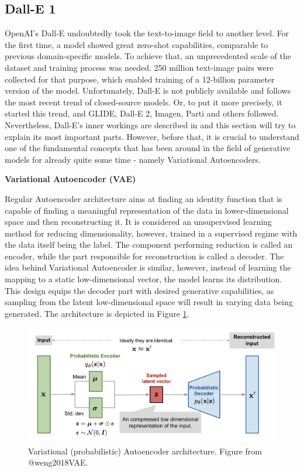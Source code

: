 \documentclass[
]{krantz}
\begin{document}
\hypertarget{dall-e-1}{%
\subsection{Dall-E 1}\label{dall-e-1}}

OpenAI's Dall-E undoubtedly took the text-to-image field to another level. For the first time, a model showed great zero-shot capabilities, comparable to previous domain-specific models. To achieve that, an unprecedented scale of the dataset and training process was needed. 250 million text-image pairs were collected for that purpose, which enabled training of a 12-billion parameter version of the model. Unfortunately, Dall-E is not publicly available and follows the most recent trend of closed-source models. Or, to put it more precisely, it started this trend, and GLIDE, Dall-E 2, Imagen, Parti and others followed. Nevertheless, Dall-E's inner workings are described in \citet{DALLE1} and this section will try to explain its most important parts. However, before that, it is crucial to understand one of the fundamental concepts that has been around in the field of generative models for already quite some time - namely Variational Autoencoders.

\textbf{Variational Autoencoder (VAE)}

Regular Autoencoder architecture aims at finding an identity function that is capable of finding a meaningful representation of the data in lower-dimensional space and then reconstructing it. It is considered an unsupervised learning method for reducing dimensionality, however, trained in a supervised regime with the data itself being the label. The component performing reduction is called an encoder, while the part responsible for reconstruction is called a decoder. The idea behind Variational Autoencoder \citep{VAE2013} is similar, however, instead of learning the mapping to a static low-dimensional vector, the model learns its distribution. This design equips the decoder part with desired generative capabilities, as sampling from the latent low-dimensional space will result in varying data being generated. The architecture is depicted in Figure \ref{fig:vae}.

\begin{figure}

{\centering \includegraphics[width=1\linewidth]{figures/02-02-text-2-img/vae} 

}

\caption{Variational (probabilistic) Autoencoder architecture. Figure from @weng2018VAE.}\label{fig:vae}
\end{figure}
\end{document}
